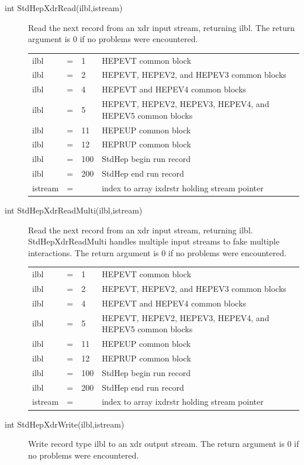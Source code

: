 \begin{description}
\item[int StdHepXdrRead(ilbl,istream)]
 Read the next record from an xdr input stream, returning ilbl.
 The return argument is 0 if no problems were encountered.

\begin{tabular}{lcll}
ilbl & = & 1   & HEPEVT common block \\
ilbl & = & 2   & HEPEVT, HEPEV2, and HEPEV3 common blocks \\
ilbl & = & 4   & HEPEVT and HEPEV4 common blocks \\
ilbl & = & 5   & HEPEVT, HEPEV2, HEPEV3, HEPEV4, and HEPEV5 common blocks \\
ilbl & = & 11  & HEPEUP common block \\
ilbl & = & 12  & HEPRUP common block \\
ilbl & = & 100 & StdHep begin run record \\
ilbl & = & 200 & StdHep end run record \\
istream & = &  & index to array ixdrstr holding stream pointer \\
\end{tabular}

\item[int StdHepXdrReadMulti(ilbl,istream)]
 Read the next record from an xdr input stream, returning ilbl.
 StdHepXdrReadMulti handles multiple input streams to fake
 multiple interactions.
 The return argument is 0 if no problems were encountered.

\begin{tabular}{lcll}
ilbl & = & 1   & HEPEVT common block \\
ilbl & = & 2   & HEPEVT, HEPEV2, and HEPEV3 common blocks \\
ilbl & = & 4   & HEPEVT and HEPEV4 common blocks \\
ilbl & = & 5   & HEPEVT, HEPEV2, HEPEV3, HEPEV4, and HEPEV5 common blocks \\
ilbl & = & 11  & HEPEUP common block \\
ilbl & = & 12  & HEPRUP common block \\
ilbl & = & 100 & StdHep begin run record \\
ilbl & = & 200 & StdHep end run record \\
istream & = &  & index to array ixdrstr holding stream pointer \\
\end{tabular}

\item[int StdHepXdrWrite(ilbl,istream)]
 Write record type ilbl to an xdr output stream.
 The return argument is 0 if no problems were encountered.


\end{description}
